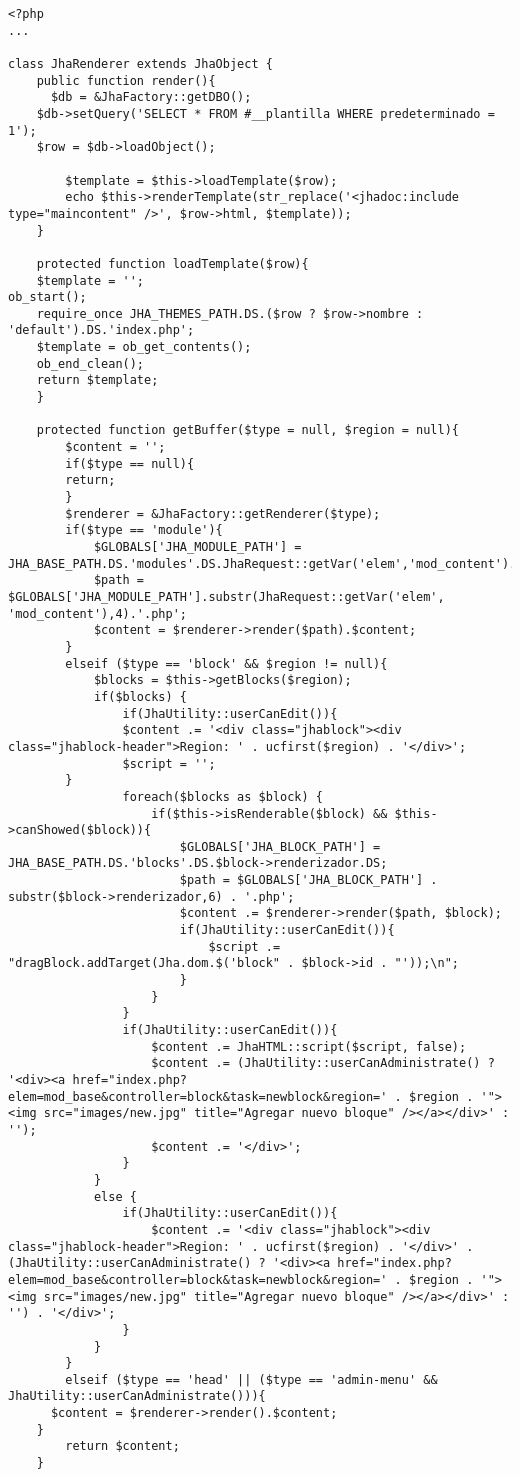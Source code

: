 \begin{lstlisting}[label=jha_renderer,caption=Renderizador JhaRenderer.]
<?php
...

class JhaRenderer extends JhaObject {
	public function render(){
	  $db = &JhaFactory::getDBO();
    $db->setQuery('SELECT * FROM #__plantilla WHERE predeterminado = 1');
    $row = $db->loadObject();

		$template = $this->loadTemplate($row);
		echo $this->renderTemplate(str_replace('<jhadoc:include type="maincontent" />', $row->html, $template));
	}
	 
	protected function loadTemplate($row){
    $template = '';
ob_start();
    require_once JHA_THEMES_PATH.DS.($row ? $row->nombre : 'default').DS.'index.php';
    $template = ob_get_contents();
    ob_end_clean();
    return $template;
	}
	
	protected function getBuffer($type = null, $region = null){
		$content = '';
		if($type == null){
	    return;
		}
		$renderer = &JhaFactory::getRenderer($type);
		if($type == 'module'){
			$GLOBALS['JHA_MODULE_PATH'] = JHA_BASE_PATH.DS.'modules'.DS.JhaRequest::getVar('elem','mod_content').DS;
			$path = $GLOBALS['JHA_MODULE_PATH'].substr(JhaRequest::getVar('elem', 'mod_content'),4).'.php';
			$content = $renderer->render($path).$content;
		}
		elseif ($type == 'block' && $region != null){
			$blocks = $this->getBlocks($region);
			if($blocks) {
				if(JhaUtility::userCanEdit()){
			    $content .= '<div class="jhablock"><div class="jhablock-header">Region: ' . ucfirst($region) . '</div>';
			    $script = '';
        }
				foreach($blocks as $block) {
					if($this->isRenderable($block) && $this->canShowed($block)){
						$GLOBALS['JHA_BLOCK_PATH'] = JHA_BASE_PATH.DS.'blocks'.DS.$block->renderizador.DS;
						$path = $GLOBALS['JHA_BLOCK_PATH'] . substr($block->renderizador,6) . '.php';
						$content .= $renderer->render($path, $block);
						if(JhaUtility::userCanEdit()){
							$script .= "dragBlock.addTarget(Jha.dom.$('block" . $block->id . "'));\n";
						}
					}
				}
				if(JhaUtility::userCanEdit()){
					$content .= JhaHTML::script($script, false);
					$content .= (JhaUtility::userCanAdministrate() ? '<div><a href="index.php?elem=mod_base&controller=block&task=newblock&region=' . $region . '"><img src="images/new.jpg" title="Agregar nuevo bloque" /></a></div>' : '');
					$content .= '</div>';
				}
			}
			else {
				if(JhaUtility::userCanEdit()){
					$content .= '<div class="jhablock"><div class="jhablock-header">Region: ' . ucfirst($region) . '</div>' . (JhaUtility::userCanAdministrate() ? '<div><a href="index.php?elem=mod_base&controller=block&task=newblock&region=' . $region . '"><img src="images/new.jpg" title="Agregar nuevo bloque" /></a></div>' : '') . '</div>';
				}
			}
		}
		elseif ($type == 'head' || ($type == 'admin-menu' && JhaUtility::userCanAdministrate())){
      $content = $renderer->render().$content;
    }
		return $content;
	}
	

\end{lstlisting}
